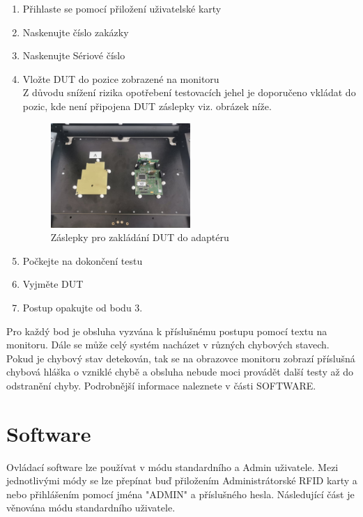 	\begin{enumerate}
		\item Přihlaste se pomocí přiložení uživatelské karty
		\item Naskenujte číslo zakázky
		\item Naskenujte Sériové číslo
		\item Vložte DUT do pozice zobrazené na monitoru\\
        Z důvodu snížení rizika opotřebení testovacích jehel je doporučeno vkládat do pozic, kde není připojena DUT záslepky viz. obrázek níže.
        \begin{figure}[ht!]
            \centering
            \includegraphics[width = 0.5\textwidth]{obrazky/adapt_zaslepka.jpg}
            \caption{Záslepky pro zakládání DUT do adaptéru}
        \end{figure}
    
		\item Počkejte na dokončení testu
		\item Vyjměte DUT
		\item Postup opakujte od bodu 3.
		\end{enumerate}

	Pro každý bod je obsluha vyzvána k příslušnému postupu pomocí textu na monitoru.
	Dále se může celý systém nacházet v různých chybových stavech. Pokud je chybový stav detekován,
	tak se na obrazovce monitoru zobrazí příslušná chybová hláška o vzniklé chybě a obsluha nebude moci provádět další testy
	až do odstranění chyby. Podrobnější informace naleznete v části SOFTWARE.

\chapter{Software}
Ovládací software lze používat v módu standardního a Admin uživatele.
Mezi jednotlivými módy se lze přepínat buď přiložením Administrátorské RFID karty a nebo
přihlášením pomocí jména "ADMIN" a příslušného hesla. Následující část je věnována módu standardního uživatele.
